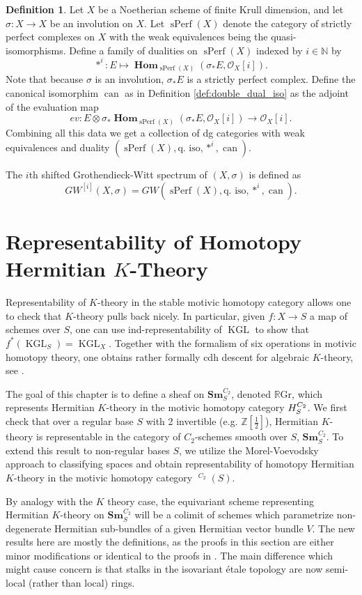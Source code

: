 \documentclass[edeposit,fullpage]{uiucthesis2009}
\newcommand{\Z}{\mathbb Z}
\newcommand{\mbb}{\mathbb}
\newcommand{\mc}{\mathcal}
\newcommand{\RGr}{\mathbb R\mathrm{Gr}}
\newcommand{\Sm}[1]{\mathbf{Sm}_{#1}}
\newcommand{\mothom}{\mathbf{H}}
\DeclareMathOperator{\can}{can}
\DeclareMathOperator{\iHom}{\mathbf{Hom}}
\DeclareMathOperator{\sPerf}{sPerf}
\DeclareMathOperator{\KGL}{KGL}
\DeclareMathOperator{\HH}{\underline{H}}
\theoremstyle{plain}
\numberwithin{lemma}{section}
\theoremstyle{definition}
\newtheorem{definition}[lemma]{Definition}
\begin{document}
\begin{definition}
Let $X$ be a Noetherian scheme of finite Krull dimension, and let
$\sigma : X \rightarrow X$ be an involution on $X$. Let $\sPerf(X)$
denote the category of strictly perfect complexes on $X$ with the weak
equivalences being the quasi-isomorphisms. Define a family of dualities on
$\sPerf(X)$ indexed by $i \in \mbb N$ by 
\[
\ast^i : E \mapsto \iHom_{\sPerf(X)}(\sigma_*E,\mc O_X[i]).
\]
Note that because $\sigma$ is an involution, $\sigma_*E$ is a
strictly perfect complex. Define the canonical isomorphim $\can$ as in Definition
\ref{def:double_dual_iso} as the adjoint of the evaluation map
\[
ev : E \otimes \sigma_*\iHom_{\sPerf(X)}(\sigma_* E, \mc O_X[i])
\rightarrow \mc O_X[i].
\]
Combining all this data we get a collection of dg categories with weak equivalences
and duality $(\sPerf(X),\text{q. iso}, \ast^i,\can)$.

The $i$th shifted Grothendieck-Witt spectrum of $(X,\sigma)$ is
defined as
\[
GW^{[i]}(X,\sigma) = GW (\sPerf(X),\text{q. iso}, \ast^i,\can).
\]
\end{definition}

\chapter{Representability of Homotopy Hermitian $K$-Theory}\label{chap:herm_grass}


Representability of $K$-theory in the stable motivic homotopy category
allows one to check that $K$-theory pulls back nicely. In particular,
given $f : X \rightarrow S$ a map of schemes over $S$, one can use
ind-representability of $\KGL$ to show that
$f^*(\KGL_S) = \KGL_X$. Together with the formalism of six operations
in motivic homotopy theory, one obtains rather formally cdh descent for algebraic
$K$-theory, see \cite{DenRep}.

The goal of
this chapter is to define a sheaf on $\Sm{S}^{C_2}$, denoted $\RGr$, which represents
Hermitian $K$-theory in the motivic homotopy category $\mathcal
\mothom_S^{C_2}$. We first check that over a regular base $S$ with 2 invertible
(e.g. $\Z[\frac{1}{2}]$), Hermitian $K$-theory is representable in the
category of $C_2$-schemes smooth over $S$, $\Sm{S}^{C_2}$. To
extend this result to non-regular bases $S$, we utilize the
Morel-Voevodsky approach to classifying spaces and obtain
representability of homotopy Hermitian $K$-theory in the motivic homotopy category $\HH^{C_2}(S)$.

By analogy with the $K$ theory case, the equivariant scheme
representing Hermitian $K$-theory on $\Sm{S}^{C_2}$ will be a colimit of schemes
which parametrize non-degenerate Hermitian sub-bundles of a given
Hermitian vector bundle $V$. The new results here are mostly the
definitions, as the proofs in this section are either
minor modifications or identical to the proofs in \cite{SchTri}. The
main difference which might cause concern is that stalks in the
isovariant \'etale topology are now semi-local (rather than
local) rings. 
\end{document}
